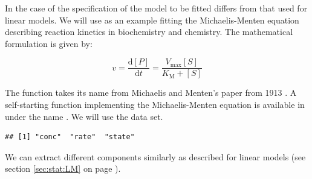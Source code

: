 \documentclass[krantz2]{krantz}\usepackage{knitr}
\begin{document}
In the case of  the specification of the model to be fitted differs from that used for linear models. We will use as an example fitting the Michaelis-Menten equation describing reaction kinetics in biochemistry and chemistry. The mathematical formulation is given by:

\begin{equation}\label{eq:michaelis:menten}
v = \frac{\mathrm{d} [P]}{\mathrm{d} t} = \frac{V_{\mathrm{max}} [S]}{K_{\mathrm{M}} + [S]}
\end{equation}

The function takes its name from Michaelis and Menten's paper from 1913 \autocite{Johnson2011}. A self-starting function implementing the Michaelis-Menten equation is available in \Rlang under the name . We will use the  data set.

\begin{knitrout}\footnotesize
{}\color{fgcolor}\begin{kframe}
\begin{alltt}
\end{alltt}
\begin{verbatim}
## [1] "conc"  "rate"  "state"
\end{verbatim}
\end{kframe}
\end{knitrout}

\begin{knitrout}\footnotesize
{}\color{fgcolor}\begin{kframe}
\begin{alltt}
 \hlkwb{<-}  \hlopt{~}   
              \hlopt{==} \hlstd{)}
\end{alltt}
\end{kframe}
\end{knitrout}

We can extract different components similarly as described for linear models (see section \ref{sec:stat:LM} on page \pageref{sec:stat:LM}).
\end{document}
